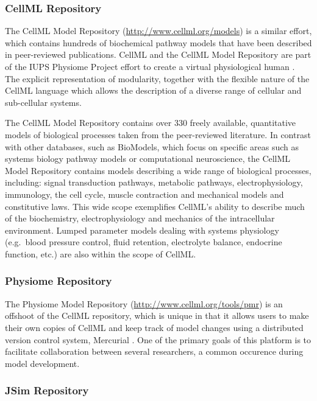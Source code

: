 \documentclass[]{article}
\begin{document}
\subsubsection{CellML Repository}

The CellML Model Repository (\url{http://www.cellml.org/models})
\autocite{lloyd2008cellml} \autocite{beard2009cellml} is a similar
effort, which contains hundreds of biochemical pathway models that have
been described in peer-reviewed publications. CellML and the CellML
Model Repository are part of the IUPS Physiome Project effort to create
a virtual physiological human \autocite{hunter2005integration}. The
explicit representation of modularity, together with the flexible nature
of the CellML language which allows the description of a diverse range
of cellular and sub-cellular systems.

The CellML Model Repository contains over 330 freely available,
quantitative models of biological processes taken from the peer-reviewed
literature. In contrast with other databases, such as BioModels, which
focus on specific areas such as systems biology pathway models or
computational neuroscience, the CellML Model Repository contains models
describing a wide range of biological processes, including: signal
transduction pathways, metabolic pathways, electrophysiology,
immunology, the cell cycle, muscle contraction and mechanical models and
constitutive laws. This wide scope exemplifies CellML's ability to
describe much of the biochemistry, electrophysiology and mechanics of
the intracellular environment. Lumped parameter models dealing with
systems physiology (e.g.~blood pressure control, fluid retention,
electrolyte balance, endocrine function, etc.) are also within the scope
of CellML.

\subsubsection{Physiome Repository}

The Physiome Model Repository (\url{http://www.cellml.org/tools/pmr})
\autocite{yu2011physiome} is an offshoot of the CellML repository, which
is unique in that it allows users to make their own copies of CellML and
keep track of model changes using a distributed version control system,
Mercurial \autocite{o2007distributed}. One of the primary goals of this
platform is to facilitate collaboration between several researchers, a
common occurence during model development.

\subsubsection{JSim Repository}
\end{document}

